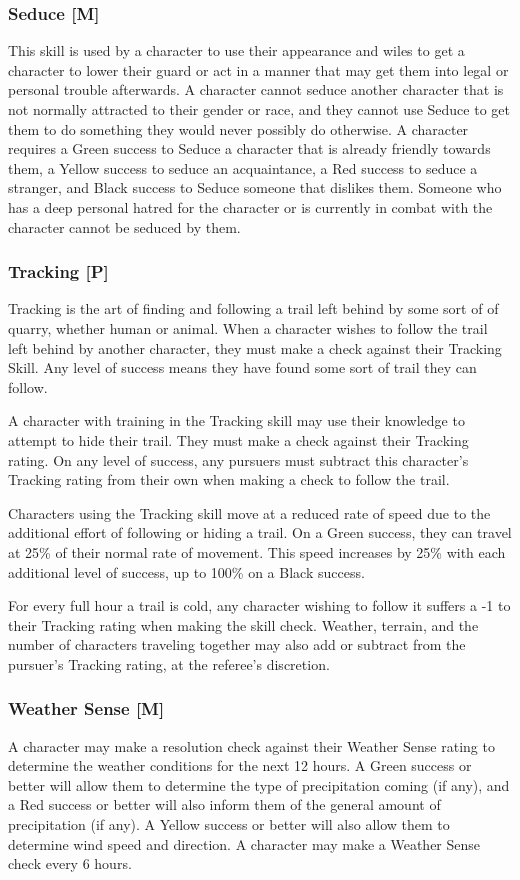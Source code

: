 \documentclass[oneside]{book}
\begin{document}
\begin{multicols}{2}
\subsubsection{Seduce [M]}
This skill is used by a character to use their appearance and wiles to get a character to lower their guard or act in a manner that may get them into legal or personal trouble afterwards. A character cannot seduce another character that is not normally attracted to their gender or race, and they cannot use Seduce to get them to do something they would never possibly do otherwise. A character requires a Green success to Seduce a character that is already friendly towards them, a Yellow success to seduce an acquaintance, a Red success to seduce a stranger, and Black success to Seduce someone that dislikes them. Someone who has a deep personal hatred for the character or is currently in combat with the character cannot be seduced by them.

\subsubsection{Tracking [P]}
Tracking is the art of finding and following a trail left behind by some sort of of quarry, whether human or animal. When a character wishes to follow the trail left behind by another character, they must make a check against their Tracking Skill. Any level of success means they have found some sort of trail they can follow.

A character with training in the Tracking skill may use their knowledge to attempt to hide their trail. They must make a check against their Tracking rating. On any level of success, any pursuers must subtract this character's Tracking rating from their own when making a check to follow the trail. 

Characters using the Tracking skill move at a reduced rate of speed due to the additional effort of following or hiding a trail. On a Green success, they can travel at 25\% of their normal rate of movement. This speed increases by 25\% with each additional level of success, up to 100\% on a Black success.

For every full hour a trail is cold, any character wishing to follow it suffers a -1 to their Tracking rating when making the skill check. Weather, terrain, and the number of characters traveling together may also add or subtract from the pursuer's Tracking rating, at the referee's discretion.

\subsubsection{Weather Sense [M]}
A character may make a resolution check against their Weather Sense rating to determine the weather conditions for the next 12 hours. A Green success or better will allow them to determine the type of precipitation coming (if any), and a Red success or better will also inform them of the general amount of precipitation (if any). A Yellow success or better will also allow them to determine wind speed and direction. A character may make a Weather Sense check every 6 hours.


\end{multicols}
\end{document}
